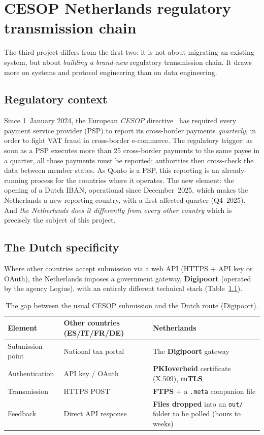 \chapter{CESOP Netherlands regulatory transmission chain}\label{ch:cesop}

The third project differs from the first two: it is not about migrating an existing system, but about \emph{building a brand-new} regulatory transmission chain. It draws more on systems and protocol engineering than on data engineering.

\section{Regulatory context}

Since 1~January 2024, the European \emph{CESOP} directive~\cite{cesop-eu} has required every payment service provider (PSP) to report its cross-border payments \emph{quarterly}, in order to fight VAT fraud in cross-border e-commerce. The regulatory trigger: as soon as a PSP executes more than 25 cross-border payments to the same payee in a quarter, all those payments must be reported; authorities then cross-check the data between member states. As Qonto is a PSP, this reporting is an already-running process for the countries where it operates. The new element: the opening of a Dutch IBAN, operational since December~2025, which makes the Netherlands a new reporting country, with a first affected quarter (Q4~2025). And \emph{the Netherlands does it differently from every other country} which is precisely the subject of this project.

\section{The Dutch specificity}

Where other countries accept submission via a web API (HTTPS + API key or OAuth), the Netherlands imposes a government gateway, \textbf{Digipoort} (operated by the agency Logius), with an entirely different technical stack (Table~\ref{tab:nl-delta}).

\begin{table}[H]
\centering\small
\renewcommand{\arraystretch}{1.3}
\begin{tabularx}{\textwidth}{@{}p{3.2cm}XX@{}}
\toprule
\textbf{Element} & \textbf{Other countries (ES/IT/FR/DE)} & \textbf{Netherlands} \\
\midrule
Submission point & National tax portal & The \textbf{Digipoort} gateway \\
Authentication & API key / OAuth & \textbf{PKIoverheid} certificate (X.509), \textbf{mTLS} \\
Transmission & HTTPS POST & \textbf{FTPS} + a \texttt{.meta} companion file \\
Feedback & Direct API response & \textbf{Files dropped} into an \texttt{out/} folder to be polled (hours to weeks) \\
\bottomrule
\end{tabularx}
\caption{The gap between the usual CESOP submission and the Dutch route (Digipoort).}
\label{tab:nl-delta}
\end{table}

